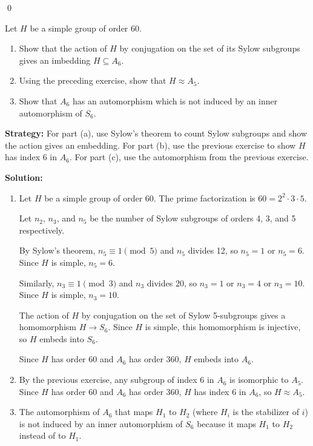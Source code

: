 \qed
\begin{problembox}
Let $H$ be a simple group of order 60.
\begin{enumerate}[label=(\alph*)]
\item Show that the action of $H$ by conjugation on the set of its Sylow subgroups gives an imbedding $H \subseteq A_6$.
\item Using the preceding exercise, show that $H \approx A_5$.
\item Show that $A_6$ has an automorphism which is not induced by an inner automorphism of $S_6$.
\end{enumerate}
\end{problembox}

\noindent\textbf{Strategy:} For part (a), use Sylow's theorem to count Sylow subgroups and show the action gives an embedding. For part (b), use the previous exercise to show $H$ has index 6 in $A_6$. For part (c), use the automorphism from the previous exercise.

\noindent\textbf{Solution:}
\begin{enumerate}[label=(\alph*)]
\item Let $H$ be a simple group of order 60. The prime factorization is $60 = 2^2 \cdot 3 \cdot 5$.

Let $n_2$, $n_3$, and $n_5$ be the number of Sylow subgroups of orders 4, 3, and 5 respectively.

By Sylow's theorem, $n_5 \equiv 1 \pmod{5}$ and $n_5$ divides 12, so $n_5 = 1$ or $n_5 = 6$. Since $H$ is simple, $n_5 = 6$.

Similarly, $n_3 \equiv 1 \pmod{3}$ and $n_3$ divides 20, so $n_3 = 1$ or $n_3 = 4$ or $n_3 = 10$. Since $H$ is simple, $n_3 = 10$.

The action of $H$ by conjugation on the set of Sylow 5-subgroups gives a homomorphism $H \to S_6$. Since $H$ is simple, this homomorphism is injective, so $H$ embeds into $S_6$.

Since $H$ has order 60 and $A_6$ has order 360, $H$ embeds into $A_6$.

\item By the previous exercise, any subgroup of index 6 in $A_6$ is isomorphic to $A_5$. Since $H$ has order 60 and $A_6$ has order 360, $H$ has index 6 in $A_6$, so $H \approx A_5$.

\item The automorphism of $A_6$ that maps $H_1$ to $H_2$ (where $H_i$ is the stabilizer of $i$) is not induced by an inner automorphism of $S_6$ because it maps $H_1$ to $H_2$ instead of to $H_1$.
\end{enumerate}


